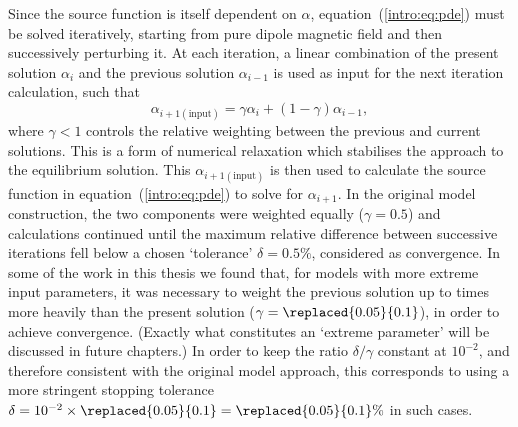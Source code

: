 Since the source function is itself dependent on $\alpha$, equation~(\ref{intro:eq:pde}) must be solved iteratively, starting from  pure dipole magnetic field and then successively perturbing it. At each iteration, a linear combination of the present solution $\alpha_i$ and the previous solution $\alpha_{i-1}$ is used as input for the next iteration calculation, such that
\begin{equation}\label{intro:eq:convergence}
\alpha_{i+1\mathrm{(input)}} = \gamma\alpha_i + (1-\gamma)\alpha_{i-1},
\end{equation}
where $\gamma<1$ controls the relative weighting between the previous and current solutions. This is a form of numerical relaxation which stabilises the approach to the equilibrium solution. This $\alpha_{i+1(\mathrm{input})}$ is then used to calculate the source function in equation~(\ref{intro:eq:pde}) to solve for $\alpha_{i+1}$. In the original model construction, the two components were weighted equally ($\gamma=0.5$) and calculations continued until the maximum relative difference between successive iterations fell below a chosen `tolerance' $\delta = 0.5\%$, considered as convergence. In some of the work in this thesis we found that, for models with more extreme input parameters, it was necessary to weight the previous solution up to  times more heavily than the present solution ($\gamma=\replaced{0.05}{0.1}$), in order to achieve convergence. (Exactly what constitutes an `extreme parameter' will be discussed in future chapters.) In order to keep the ratio $\delta/\gamma$ constant at $10^{-2}$, and therefore consistent with the original model approach, this corresponds to using a more stringent stopping tolerance $\delta = 10^{-2}\times\replaced{0.05}{0.1} = \replaced{0.05}{0.1}\%$ in such cases.

